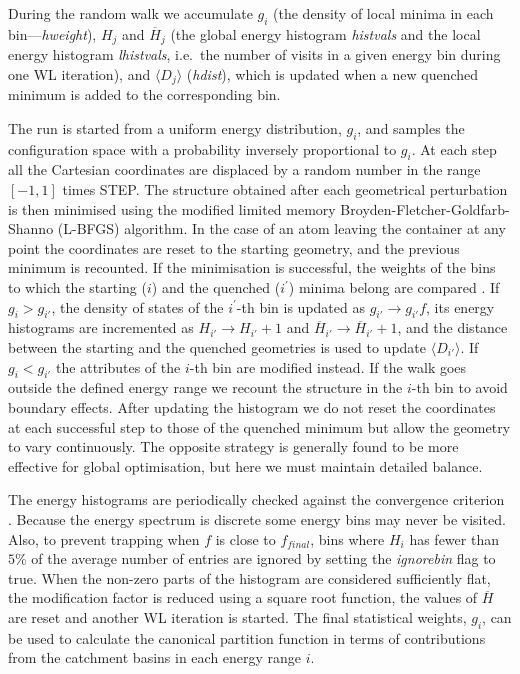 \documentclass[12pt,a4paper,dvips]{article}
\begin{document}
During the random walk we accumulate
$g_i$ (the density of local minima in each bin---{\it hweight}), 
$H_j$ and $\overline{H}_j$ (the global energy histogram {\it histvals} and the
local energy histogram {\it lhistvals}, i.e.~the
number of visits in a given energy bin during one WL iteration), 
and $\langle D_j\rangle$ ({\it hdist}), which is updated when a new quenched minimum is added
to the corresponding bin. 

The run is started from a uniform energy distribution, $g_i$, 
and samples the configuration space with a probability inversely
proportional to $g_i$.
At each step all the Cartesian coordinates are displaced by a random number in the
range $[-1,1]$ times STEP.
The structure obtained after each geometrical perturbation is then minimised
using the modified limited memory Broyden-Fletcher-Goldfarb-Shanno (L-BFGS) algorithm\cite{lbfgs}. 
In the case of an atom leaving the container at any point the coordinates are 
reset to the starting geometry, and the previous minimum is recounted.  If the
minimisation is successful, the weights of the bins to which the starting ($i$) 
and the quenched ($i^\prime$) minima belong are compared . If
$g_i > g_{i'}$, the density of states of the
$i^\prime$-th bin is updated as $g_{i'} \rightarrow g_{i'} f$,
its energy histograms are incremented as  
$H_{i'} \rightarrow H_{i'} +1$ and $\overline{H}_{i'} \rightarrow \overline{H}_{i'} +1$, and the distance
between the starting and the quenched geometries is used to update $\langle D_{i'}\rangle$.
If $g_i < g_{i'}$  the attributes of the  $i$-th bin are modified instead. 
If the walk goes outside the defined energy range
we recount the structure in the $i$-th bin to avoid boundary effects.  After updating the histogram
we do not reset the coordinates at each successful step to those of the quenched minimum 
but allow the geometry to vary
continuously. The opposite strategy is generally found to be more effective for global optimisation, 
but here we must maintain detailed balance.

The energy histograms are periodically checked against the convergence criterion . 
Because the energy spectrum is discrete some energy bins may never be visited.  
Also, to prevent trapping when $f$ is close to
$f_{final}$,  bins where $H_i$ has fewer than $5 \%$ of the average number of entries are 
ignored by setting the {\it ignorebin} flag
to true. When the non-zero parts of the
histogram are considered sufficiently flat,
the modification factor is reduced using
a square root function, the values of $\overline{H}$ are reset and another WL iteration is started. 
The final statistical weights, $g_i$, can be used to calculate the canonical partition function in 
terms of contributions from the catchment basins in each energy range $i$.  
\end{document}
